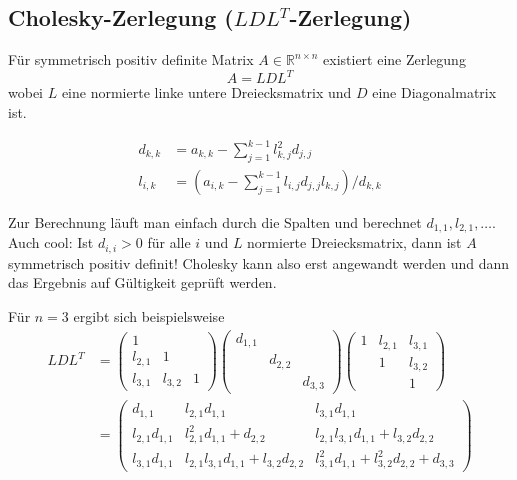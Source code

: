\documentclass[a4paper,parskip=half*,DIV=15,fontsize=11pt]{scrartcl}
\begin{document}
\subsection[Cholesky-Zerlegung]{Cholesky-Zerlegung ($LDL^T$-Zerlegung)}

\begin{minipage}[t]{0.5\textwidth}
Für symmetrisch positiv definite Matrix $A \in \mathbb{R}^{n \times n}$ existiert eine Zerlegung
\[A = LDL^T\]
wobei $L$ eine normierte linke untere Dreiecksmatrix und $D$ eine Diagonalmatrix ist.
\end{minipage}
\begin{minipage}[t]{0.5\textwidth}
\vspace{-2em}
\begin{align*}
  d_{k,k} &= a_{k,k} - \sum_{j=1}^{k-1} l_{k,j}^2 d_{j,j} \\
  l_{i,k} &= \left( a_{i,k} - \sum_{j=1}^{k-1} l_{i,j} d_{j,j} l_{k,j} \right) / d_{k,k}
\end{align*}
\end{minipage}

Zur Berechnung läuft man einfach durch die Spalten und berechnet $d_{1,1}, l_{2,1}, \ldots$. Auch cool: Ist $d_{i,i} > 0$ für alle $i$ und $L$ normierte Dreiecksmatrix, dann ist $A$ symmetrisch positiv definit! Cholesky kann also erst angewandt werden und dann das Ergebnis auf Gültigkeit geprüft werden.

Für $n = 3$ ergibt sich beispielsweise
\begin{align*}
LDL^T &= \begin{pmatrix}
	1	\\
    l_{2,1}	&	1	\\
    l_{3,1}	&	l_{3,2}	&	1
\end{pmatrix} \begin{pmatrix}
	d_{1,1}	\\
    	&	d_{2,2}	\\
        &	&	d_{3,3}
\end{pmatrix} \begin{pmatrix}
	1	&	l_{2,1}	&	l_{3,1}	\\
    	&	1	&	l_{3,2}	\\
    	&	&	1
\end{pmatrix}	\\
&= \begin{pmatrix}
	d_{1,1}	&	l_{2,1}d_{1,1}	&	l_{3,1}d_{1,1}	\\
    l_{2,1}d_{1,1}	&	l_{2,1}^2d_{1,1} + d_{2,2}	&	l_{2,1}l_{3,1}d_{1,1}+l_{3,2}d_{2,2}	\\
    l_{3,1}d_{1,1}	&	l_{2,1}l_{3,1}d_{1,1}+l_{3,2}d_{2,2}	&	l_{3,1}^2d_{1,1} + l_{3,2}^2d_{2,2} + d_{3,3}
\end{pmatrix}
\end{align*}
\end{document}
